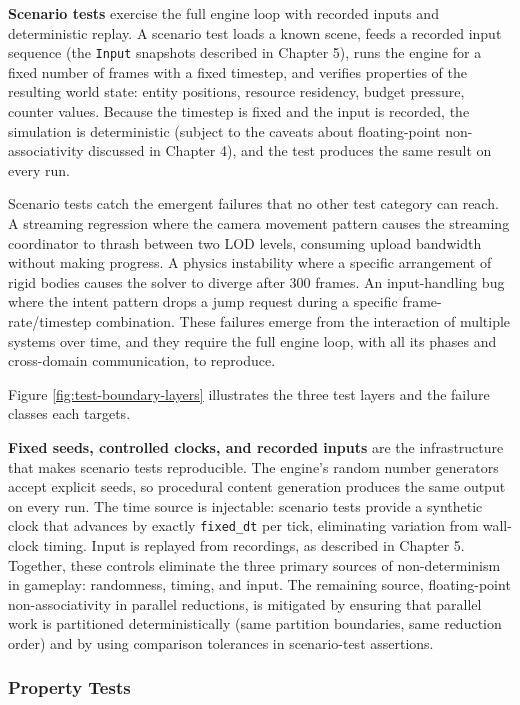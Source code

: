 \documentclass[
  11pt,
  letterpaper,
  DIV=11,
  numbers=noendperiod,
  twoside,
  open=right]{scrreprt}
\begin{document}
\textbf{Scenario tests} exercise the full engine loop with recorded
inputs and deterministic replay. A scenario test loads a known scene,
feeds a recorded input sequence (the \texttt{Input} snapshots described
in Chapter 5), runs the engine for a fixed number of frames with a fixed
timestep, and verifies properties of the resulting world state: entity
positions, resource residency, budget pressure, counter values. Because
the timestep is fixed and the input is recorded, the simulation is
deterministic (subject to the caveats about floating-point
non-associativity discussed in Chapter 4), and the test produces the
same result on every run.

Scenario tests catch the emergent failures that no other test category
can reach. A streaming regression where the camera movement pattern
causes the streaming coordinator to thrash between two LOD levels,
consuming upload bandwidth without making progress. A physics
instability where a specific arrangement of rigid bodies causes the
solver to diverge after 300 frames. An input-handling bug where the
intent pattern drops a jump request during a specific
frame-rate/timestep combination. These failures emerge from the
interaction of multiple systems over time, and they require the full
engine loop, with all its phases and cross-domain communication, to
reproduce.

Figure \ref{fig:test-boundary-layers} illustrates the three test layers
and the failure classes each targets.



\textbf{Fixed seeds, controlled clocks, and recorded inputs} are the
infrastructure that makes scenario tests reproducible. The engine's
random number generators accept explicit seeds, so procedural content
generation produces the same output on every run. The time source is
injectable: scenario tests provide a synthetic clock that advances by
exactly \texttt{fixed\_dt} per tick, eliminating variation from
wall-clock timing. Input is replayed from recordings, as described in
Chapter 5. Together, these controls eliminate the three primary sources
of non-determinism in gameplay: randomness, timing, and input. The
remaining source, floating-point non-associativity in parallel
reductions, is mitigated by ensuring that parallel work is partitioned
deterministically (same partition boundaries, same reduction order) and
by using comparison tolerances in scenario-test assertions.

\subsubsection{Property Tests}\label{property-tests}
\end{document}
